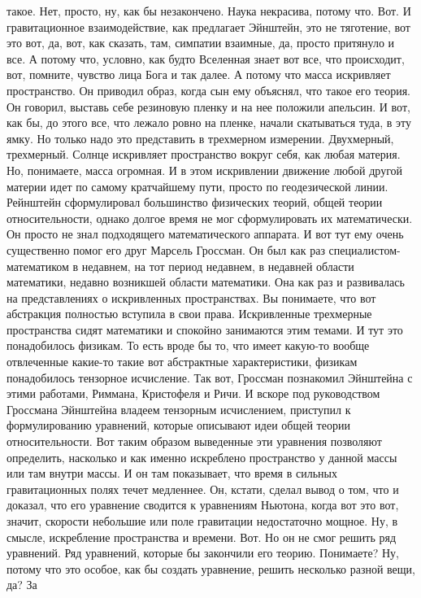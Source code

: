 такое. Нет, просто, ну, как бы незакончено. Наука некрасива, потому что. Вот. И
гравитационное взаимодействие, как предлагает Эйнштейн, это не тяготение, вот
это вот, да, вот, как сказать, там, симпатии взаимные, да, просто притянуло и
все. А потому что, условно, как будто Вселенная знает вот все, что происходит,
вот, помните, чувство лица Бога и так далее. А потому что масса искривляет
пространство. Он приводил образ, когда сын ему объяснял, что такое его теория.
Он говорил, выставь себе резиновую пленку и на нее положили апельсин. И вот, как
бы, до этого все, что лежало ровно на пленке, начали скатываться туда, в эту
ямку. Но только надо это представить в трехмерном измерении. Двухмерный,
трехмерный. Солнце искривляет пространство вокруг себя, как любая материя. Но,
понимаете, масса огромная. И в этом искривлении движение любой другой материи
идет по самому кратчайшему пути, просто по геодезической линии. Рейнштейн
сформулировал большинство физических теорий, общей теории относительности,
однако долгое время не мог сформулировать их математически. Он просто не знал
подходящего математического аппарата. И вот тут ему очень существенно помог его
друг Марсель Гроссман. Он был как раз специалистом-математиком в недавнем, на
тот период недавнем, в недавней области математики, недавно возникшей области
математики. Она как раз и развивалась на представлениях о искривленных
пространствах. Вы понимаете, что вот абстракция полностью вступила в свои права.
Искривленные трехмерные пространства сидят математики и спокойно занимаются этим
темами. И тут это понадобилось физикам. То есть вроде бы то, что имеет какую-то
вообще отвлеченные какие-то такие вот абстрактные характеристики, физикам
понадобилось тензорное исчисление. Так вот, Гроссман познакомил Эйнштейна с
этими работами, Риммана, Кристофеля и Ричи. И вскоре под руководством Гроссмана
Эйнштейна владеем тензорным исчислением, приступил к формулированию уравнений,
которые описывают идеи общей теории относительности. Вот таким образом
выведенные эти уравнения позволяют определить, насколько и как именно искреблено
пространство у данной массы или там внутри массы. И он там показывает, что время
в сильных гравитационных полях течет медленнее. Он, кстати, сделал вывод о том,
что и доказал, что его уравнение сводится к уравнениям Ньютона, когда вот это
вот, значит, скорости небольшие или поле гравитации недостаточно мощное. Ну, в
смысле, искребление пространства и времени. Вот. Но он не смог решить ряд
уравнений. Ряд уравнений, которые бы закончили его теорию. Понимаете? Ну, потому
что это особое, как бы создать уравнение, решить несколько разной вещи, да? За
